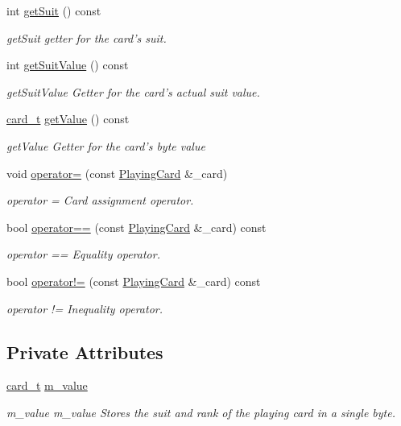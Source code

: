 \begin{DoxyCompactItemize}
int \hyperlink{classPlayingCard_a494d180a53c5b019e2c05d5394527e20}{get\-Suit} () const 
\begin{DoxyCompactList}\small\item\em get\-Suit getter for the card's suit. \end{DoxyCompactList}\item 
int \hyperlink{classPlayingCard_a49ccae93e0f76cc6d4a9bf21af01785c}{get\-Suit\-Value} () const 
\begin{DoxyCompactList}\small\item\em get\-Suit\-Value Getter for the card's actual suit value. \end{DoxyCompactList}\item 
\hyperlink{Dealer_8h_a1d862217db80f850f49ee1d961f93b59}{card\-\_\-t} \hyperlink{classPlayingCard_ab7d378802b887941584531bf752374c6}{get\-Value} () const 
\begin{DoxyCompactList}\small\item\em get\-Value Getter for the card's byte value \end{DoxyCompactList}\item 
void \hyperlink{classPlayingCard_ae10f4ac30e42df655fa3a4d4a6bdf267}{operator=} (const \hyperlink{classPlayingCard}{Playing\-Card} \&\-\_\-card)
\begin{DoxyCompactList}\small\item\em operator = Card assignment operator. \end{DoxyCompactList}\item 
bool \hyperlink{classPlayingCard_a25b6acc583f2e9c582ae5dd98a4605d4}{operator==} (const \hyperlink{classPlayingCard}{Playing\-Card} \&\-\_\-card) const 
\begin{DoxyCompactList}\small\item\em operator == Equality operator. \end{DoxyCompactList}\item 
bool \hyperlink{classPlayingCard_af17d532643be02312af99f675a6a0486}{operator!=} (const \hyperlink{classPlayingCard}{Playing\-Card} \&\-\_\-card) const 
\begin{DoxyCompactList}\small\item\em operator != Inequality operator. \end{DoxyCompactList}\end{DoxyCompactItemize}
\subsection*{Private Attributes}
\begin{DoxyCompactItemize}
\item 
\hyperlink{Dealer_8h_a1d862217db80f850f49ee1d961f93b59}{card\-\_\-t} \hyperlink{classPlayingCard_a9e6ebe066a1a412017420218b6988534}{m\-\_\-value}
\begin{DoxyCompactList}\small\item\em m\-\_\-value m\-\_\-value Stores the suit and rank of the playing card in a single byte. \end{DoxyCompactList}\end{DoxyCompactItemize}
